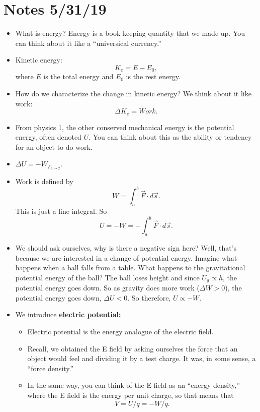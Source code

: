 \documentclass[12pt]{extreport}
\begin{document}
\section{Notes 5/31/19}
	\begin{itemize}
		\item What is energy? Energy is a book keeping quantity that we made up. You can think about it like a ``universical currency.''

		\item Kinetic energy: $$K_e = E - E_0,$$ where $E$ is the total energy and $E_0$ is the rest energy.

		\item How do we characterize the change in kinetic energy? We think about it like work: $$\Delta K_e = Work.$$

		\item From physics 1, the other conserved mechanical energy is the potential energy, often denoted $U.$ You can think about this as the ability or tendency for an object to do work.

		\item $\Delta U = -W_{F_{1 \rightarrow 2}}.$ 

		\item Work is defined by $$W = \int_a^b \vec F \cdot d \vec s.$$ This is just a line integral. So $$U = -W = -\int_a^b \vec F \cdot d \vec s.$$

		\item We should ask ourselves, why is there a negative sign here? Well, that's because we are interested in a change of potential energy. Imagine what happens when a ball falls from a table. What happens to the gravitational potential energy of the ball? The ball loses height and since $U_g \propto h$, the potential energy goes down. So as gravity does more work ($\Delta W > 0$), the potential energy goes down, $\Delta U < 0.$ So therefore, $U \propto -W.$

		\item We introduce \textbf{electric potential:}
			\begin{itemize}
				\item Electric potential is the energy analogue of the electric field.
				\item Recall, we obtained the E field by asking ourselves the force that an object would feel and dividing it by a test charge. It was, in some sense, a ``force density.'' 

				\item In the same way, you can think of the E field as an ``energy density,'' where the E field is the energy per unit charge, so that means that $$V = U/q = -W/q.$$


\end{itemize}
\end{itemize}
\end{document}

